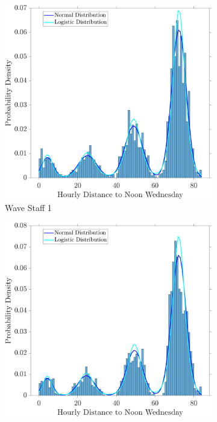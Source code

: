 \documentclass[
10pt, %
letterpaper, %
twoside, %
headinclude,footinclude, %
BCOR5mm, %
]{scrartcl}
\begin{document}
\begin{figure}[h!]
	\centering
	\begin{subfigure}[t]{0.49\linewidth}
		\centering
		\includegraphics[width=\linewidth]{figures/HourPDF_LOG1.pdf}
		\caption{Wave Staff 1} 
		\label{fig:HourL1}
	\end{subfigure}
	\begin{subfigure}[t]{0.49\linewidth}
		\centering
		\includegraphics[width=\linewidth]{figures/HourPDF_LOG2.pdf}

\end{subfigure}
\end{figure}
\end{document}
